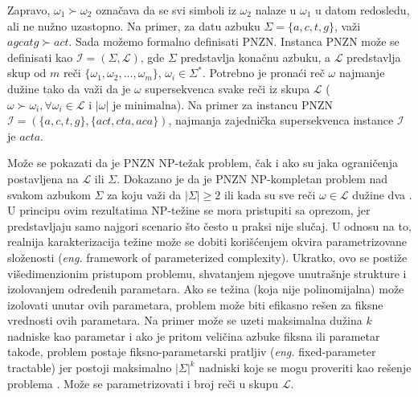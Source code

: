 \documentclass[12pt,oneside]{memoir}
\begin{document}
Zapravo, $\omega_{1}\succ\omega_{2}$ označava da se svi simboli iz $\omega_{2}$ nalaze u $\omega_{1}$ u datom redosledu,
ali ne nužno uzastopno. Na primer, za datu azbuku $\Sigma=\{a,c,t,g\}$, važi $agcatg \succ act$.
Sada možemo formalno definisati PNZN. Instanca PNZN može se definisati kao $\mathcal{I} =(\Sigma,\mathcal{L})$, gde 
$\Sigma$  predstavlja konačnu azbuku, a $\mathcal{L}$ predstavlja skup od $m$ reči $\{\omega_{1},\omega_{2},...,\omega_{m}\}$,
$\omega_{i}\in\Sigma^*$. Potrebno je pronaći reč $\omega$ najmanje dužine tako da važi da je $\omega$ supersekvenca svake reči iz
skupa $\mathcal{L}$ ($\omega\succ\omega_{i}, \forall\omega_{i}\in\mathcal{L} \textrm{ i } |\omega| \textrm{ je minimalna}$).
Na primer za instancu PNZN $\mathcal{I}=(\{a,c,t,g\},\{act,cta,aca\})$, najmanja zajednička supersekvenca
instance $\mathcal{I}$ je $acta$.

Može se pokazati da je PNZN NP-težak problem, čak i ako su jaka ograničenja postavljena na $\mathcal{L}$ ili $\Sigma$. 
Dokazano je da je PNZN NP-kompletan problem nad svakom azbukom $\Sigma$ za koju važi da $|\Sigma|\geqslant2$ \cite{NPComplete}
ili kada su sve reči $\omega \in \mathcal{L}$ dužine dva \cite{SCSNP}. U principu ovim rezultatima NP-težine se mora
pristupiti sa oprezom, jer predstavljaju samo najgori scenario što često u praksi nije slučaj. U odnosu na to,
realnija karakterizacija težine može se dobiti korišćenjem okvira parametrizovane složenosti (\textit{eng.} framework of parameterized
complexity). Ukratko, ovo se postiže višedimenzionim pristupom problemu, shvatanjem njegove unutrašnje strukture i izolovanjem
određenih parametara. Ako se težina (koja nije polinomijalna) može izolovati unutar ovih parametara, problem može biti
efikasno rešen za fiksne vrednosti ovih parametara. Na primer može se uzeti
maksimalna dužina $k$ nadniske kao parametar i ako je pritom veličina azbuke fiksna ili parametar takođe, problem postaje
fiksno-parametarski pratljiv (\textit{eng.} fixed-parameter tractable) jer postoji maksimalno $|\Sigma|^{k}$ nadniski
koje se mogu proveriti kao rešenje problema \cite{ProbabilisticBS}. Može se parametrizovati i broj reči u skupu $\mathcal{L}$.
\end{document}

